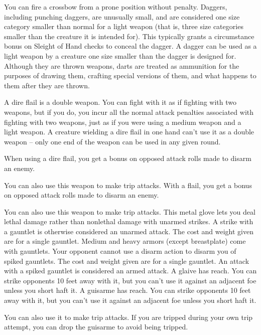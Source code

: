 \par You can fire a crossbow from a prone position without penalty.
 Daggers, including punching daggers, are unusually small, and are considered one size category smaller than normal for a light weapon (that is, three size categories smaller than the creature it is intended for). This typically grants a  circumstance bonus on Sleight of Hand checks to conceal the dagger. A dagger can be used as a light weapon by a creature one size smaller than the dagger is designed for.
 Although they are thrown weapons, darts are treated as ammunition for the purposes of drawing them, crafting special versions of them, and what happens to them after they are thrown.

 A dire flail is a double weapon. You can fight with it as if fighting with two weapons, but if you do, you incur all the normal attack penalties associated with fighting with two weapons, just as if you were using a medium weapon and a light weapon. A creature wielding a dire flail in one hand can't use it as a double weapon -- only one end of the weapon can be used in any given round.
\par When using a dire flail, you get a  bonus on opposed attack rolls made to disarm an enemy.
\par You can also use this weapon to make trip attacks.
 With a flail, you get a  bonus on opposed attack rolls made to disarm an enemy.
\par You can also use this weapon to make trip attacks.
 This metal glove lets you deal lethal damage rather than nonlethal damage with unarmed strikes. A strike with a gauntlet is otherwise considered an unarmed attack. The cost and weight given are for a single gauntlet. Medium and heavy armors (except breastplate) come with gauntlets.
 Your opponent cannot use a disarm action to disarm you of spiked gauntlets. The cost and weight given are for a single gauntlet. An attack with a spiked gauntlet is considered an armed attack.
 A glaive has reach. You can strike opponents 10 feet away with it, but you can't use it against an adjacent foe unless you short haft it.
 A guisarme has reach. You can strike opponents 10 feet away with it, but you can't use it against an adjacent foe unless you short haft it.
\par You can also use it to make trip attacks. If you are tripped during your own trip attempt, you can drop the guisarme to avoid being tripped.
